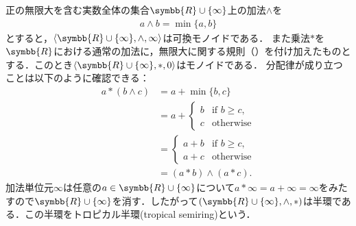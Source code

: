 \documentclass[../main.tex]{subfiles}
\begin{document}
\begin{exa} 正の無限大を含む実数全体の集合\(\symbb{R} \cup \{\infty\}\)上の加法\(\land\)を
\begin{align*}
    a \land b = \min \{a, b\}
\end{align*}
とすると，\(\langle \symbb{R} \cup \{\infty\}, \land, \infty\rangle\)は可換モノイドである．
また乗法\(\mathord{\ast}\)を\(\symbb{R}\)における通常の加法に，無限大に関する規則（）を付け加えたものとする．このとき\(\langle \symbb{R} \cup \{\infty\}, \mathord{\ast}, 0 \rangle\)はモノイドである．
分配律が成り立つことは以下のように確認できる：
\begin{align*}
    a \mathbin{\ast} (b \land c)
    &= a + \min \{b, c\} \\
    &= a +
    \begin{cases}
        b & \text{if \(b \geq c\),} \\
        c & \text{otherwise}
    \end{cases} \\
    &=
    \begin{cases}
        a + b  & \text{if \(b \geq c\),} \\
        a + c & \text{otherwise}
    \end{cases} \\
    &= (a \mathbin{\ast} b) \land (a \mathbin{\ast} c).
\end{align*}
    加法単位元\(\infty\)は任意の\(a \in \symbb{R} \cup \{\infty\}\)について\(a \mathbin{\ast} \infty = a + \infty = \infty\)をみたすので\(\symbb{R}\cup\{\infty\}\)を消す．したがって\(\tuple{ \symbb{R} \cup \{\infty\}, \mathord{\land}, \mathord{\ast} }\)は半環である．この半環をトロピカル半環(tropical semiring)という．
\end{exa}

\begin{thmbox}
\begin{definition}[（ベクトル空間）]
\end{definition}
\end{thmbox}
\end{document}
